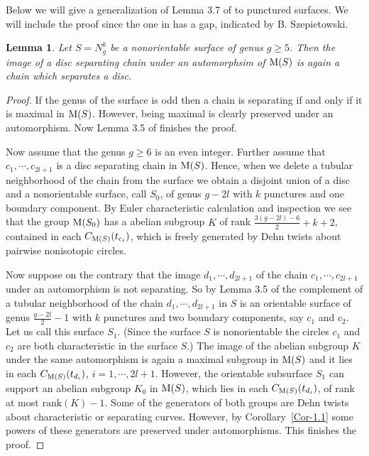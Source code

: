 \documentclass[11 pt]{amsart}
\newtheorem{Lemma}[Theorem]{Lemma}
\theoremstyle{definition}
\begin{document}
Below we will give a generalization of Lemma 3.7 of \cite{A} to
punctured surfaces. We will include the proof since the one in
\cite{A} has a gap, indicated by B. Szepietowski.

\begin{Lemma}\label{Lem-SepChains}
Let $S=N_g^k$ be a nonorientable surface of genus $g\geq 5$. Then
the image of a disc separating chain under an automorphsim of ${\rm
M}(S)$ is again a chain which separates a disc.
\end{Lemma}

\begin{proof} If the genus of the surface is odd then a chain is
separating if and only if it is maximal in ${\rm M}(S)$.  However,
being maximal is clearly preserved under an automorphism. Now Lemma
3.5 of \cite{A} finishes the proof.

Now assume that the genus $g\geq 6$ is an even integer. Further
assume that $c_1,\cdots, c_{2l+1}$ is a disc separating chain in
${\rm M}(S)$. Hence, when we delete a tubular neighborhood of the
chain from the surface we obtain a disjoint union of a disc and a
nonorientable surface, call $S_0$, of genus $g-2l$ with $k$
punctures and one boundary component. By Euler characteristic
calculation and inspection we see that the group ${\rm M}(S_0)$ has
a abelian subgroup $K$ of rank $\displaystyle\frac{3(g-2l)-6}{2} +
k+2$, contained in each $C_{{\rm M}(S)}(t_{c_i})$, which is freely
generated by Dehn twists about pairwise nonisotopic circles.

Now suppose on the contrary that the image $d_1,\cdots, d_{2l+1}$ of
the chain $c_1,\cdots, c_{2l+1}$ under an automorphism is not
separating. So by Lemma 3.5 of \cite{A} the complement of a tubular
neighborhood of the chain $d_1,\cdots, d_{2l+1}$ in $S$ is an
orientable surface of genus $\displaystyle\frac{g-2l}{2}-1$ with $k$
punctures and two boundary components, say $c_1$ and $c_2$. Let us
call this surface $S_1$. (Since the surface $S$ is nonorientable the
circles $c_1$ and $c_2$ are both characteristic in the surface $S$.)
The image of the abelian subgroup $K$ under the same automorphism is
again a maximal subgroup in ${\rm M}(S)$ and it lies in each
$C_{{\rm M}(S)}(t_{d_i})$, $i=1,\cdots, 2l+1$. However, the
orientable subsurface $S_1$ can support an abelian subgroup $K_0$ in
${\rm M}(S)$, which lies in each $C_{{\rm M}(S)}(t_{d_i})$, of rank
at most $\mbox{rank}(K)-1$. Some of the generators of both groups
are Dehn twists about characteristic or separating curves. However,
by Corollary~\ref{Cor-1.1} some powers of these generators are
preserved under automorphisms. This finishes the proof.
\end{proof}
\end{document}
